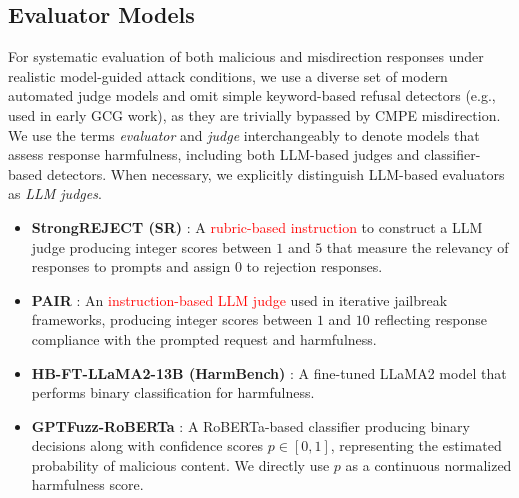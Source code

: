 \documentclass[conference,compsoc]{IEEEtran}
\def \tclr{\textcolor{red}}
\begin{document}
\subsection{Evaluator Models}\label{sec:judgemodels}
For systematic evaluation of both malicious and misdirection responses under realistic model-guided attack conditions, we use a diverse set of modern automated judge models and omit simple keyword-based refusal detectors (e.g., used in early GCG work), as they are trivially bypassed by CMPE misdirection. We use the terms \emph{evaluator} and \emph{judge} interchangeably to denote models that assess response harmfulness, including both LLM-based judges and classifier-based detectors. When necessary, we explicitly distinguish LLM-based evaluators as \emph{LLM judges}.

\begin{itemize}

    \item \textbf{StrongREJECT (SR)} \cite{sr2024}: A \tclr{rubric-based instruction} to construct a LLM judge producing integer scores between $1$ and $5$ that measure the relevancy of responses to prompts and assign $0$ to rejection responses.

    \item \textbf{PAIR} \cite{pair2023}: An \tclr{instruction-based LLM judge} used in iterative jailbreak frameworks, producing integer scores between $1$ and $10$ reflecting response compliance with the prompted request and harmfulness.

    \item \textbf{HB-FT-LLaMA2-13B (HarmBench)} \cite{harmbench}: A fine-tuned LLaMA2 model that performs binary classification for harmfulness.

    \item \textbf{GPTFuzz-RoBERTa} \cite{yu2023gptfuzzer, llmfuzzer2024}:
    A RoBERTa-based classifier producing binary decisions along with confidence scores
    $p \in [0,1]$, representing the estimated probability of malicious content.
    We directly use $p$ as a continuous normalized harmfulness score.
\end{itemize}
\end{document}
